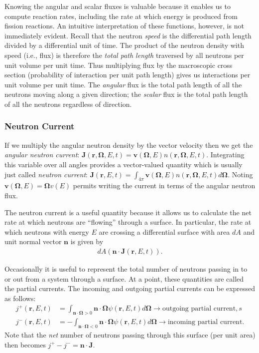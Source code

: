 \documentclass[11pt]{article}
\renewcommand\vec{\mathbf}
\begin{document}
Knowing the angular and scalar fluxes is valuable because it enables us to compute reaction rates, including the rate at which energy is produced from fission reactions.  An intuitive interpretation of these functions, however, is not immediately evident.  Recall that the neutron \emph{speed} is the differential path length divided by a differential unit of time.  The product of the neutron density with speed (i.e., flux) is therefore the \emph{total path length} traversed by all neutrons per unit volume per unit time.  Thus multiplying flux by the macroscopic cross section (probability of interaction per unit path length) gives us interactions per unit volume per unit time.  The \emph{angular} flux is the total path length of all the neutrons moving along a given direction; the \emph{scalar} flux is the total path length of all the neutrons regardless of direction.

\subsubsection{Neutron Current}
\label{sec:orgheadline46}
If we multiply the angular neutron density by the vector velocity then we get the \emph{angular neutron current}: \(\vec{J}(\vec{r},\vec{\Omega},E,t) = \vec{v}(\vec{\Omega},E) n(\vec{r},\vec{\Omega},E,t)\).  Integrating this variable over all angles provides a vector-valued quantity which is usually just called \emph{neutron current}: \(\vec{J}(\vec{r},E,t) = \int_{4\pi} \vec{v}(\vec{\Omega},E) n(\vec{r},\vec{\Omega},E,t) d\vec{\Omega}\).  Noting \(\vec{v}(\vec{\Omega},E) = \vec{\Omega}v(E)\) permits writing the current in terms of the angular neutron flux.

The neutron current is a useful quantity because it allows us to calculate the net rate at which neutrons are ``flowing'' through a surface.  In particular, the rate at which neutrons with energy \(E\) are crossing a differential surface with area \(dA\) and unit normal vector \(\vec{n}\) is given by
\begin{align}
  dA \left( \vec{n} \cdot \vec{J}(\vec{r},E,t) \right).
\end{align}

Occasionally it is useful to represent the total number of neutrons passing in to or out from a system through a surface.  At a point, these quantities are called the partial currents.  The incoming and outgoing partial currents can be expressed as follows:
\begin{align}
  j^+(\vec{r},E,t) &= \int_{\vec{n}\cdot\vec{\Omega}>0} \vec{n} \cdot \vec{\Omega} \psi(\vec{r},E,t) d\vec{\Omega} \rightarrow \text{outgoing partial current},s \\
  j^-(\vec{r},E,t) &= -\int_{\vec{n}\cdot\vec{\Omega}<0} \vec{n} \cdot \vec{\Omega} \psi(\vec{r},E,t) d\vec{\Omega} \rightarrow \text{incoming partial current}.
\end{align}
Note that the \emph{net} number of neutrons passing through this surface (per unit area) then becomes \(j^+ - j^- = \vec{n}\cdot\vec{J}\).
\end{document}

